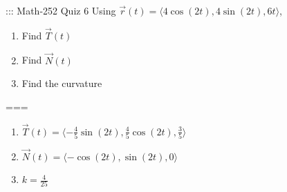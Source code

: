 ::: Math-252 Quiz 6
Using \(\vec r(t)=\langle 4\cos(2t),4\sin(2t),6t\rangle\),
\begin{enumerate}[label=\alph*.]
  \item Find \(\vec T(t)\)
  \item Find \(\vec N(t)\)
  \item Find the curvature
\end{enumerate}
===
\begin{enumerate}[label=\alph*.]
  \item \(\vec T(t)=
    \langle-\frac{4}{5}\sin(2t),\frac{4}{5}\cos(2t),\frac{3}{5}\rangle\)
  \item \(\vec N(t)=
    \langle-\cos(2t),\sin(2t),0\rangle\)
  \item \(k=\frac{4}{25}\)
\end{enumerate}
